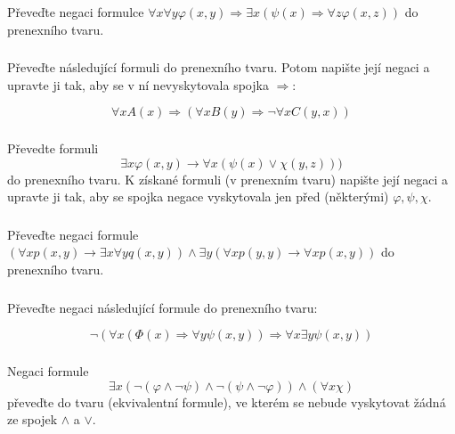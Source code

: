 \subsubsection{}
Převeďte negaci formulce $\forall x \forall y \varphi(x,y) \Rightarrow \exists x
(\psi(x) \Rightarrow \forall z \varphi(x,z))$ do prenexního tvaru.
\subsubsection{}
Převeďte následující formuli do prenexního tvaru. Potom napište její negaci a
upravte ji tak, aby se v ní nevyskytovala spojka $\Rightarrow$:

$$\forall x A(x) \Rightarrow (\forall x B(y) \Rightarrow \neg \forall x
C(y,x))$$
\subsubsection{}
Převedte formuli $$\exists x \varphi (x,y) \rightarrow \forall x(\psi(x)\vee
\chi (y,z)))$$ do prenexního tvaru. K získané formuli (v prenexním tvaru)
napište její negaci a upravte ji tak, aby se spojka negace vyskytovala jen před
(některými) $\varphi, \psi, \chi$.
\subsubsection{}
Převeďte negaci formule $(\forall x p(x,y) \rightarrow \exists x \forall y
q(x,y)) \wedge  \exists y (\forall x p(y,y) \rightarrow \forall x p(x,y))$ do
prenexního tvaru.
\subsubsection{}
Převeďte negaci následující formule do prenexního tvaru:

$$\neg(\forall x (\Phi (x) \Rightarrow \forall y \psi(x,y)) \Rightarrow \forall
x \exists y \psi(x,y))$$
\subsubsection{}
Negaci formule 
$$\exists x (\neg (\varphi \wedge \neg \psi)\wedge \neg(\psi\wedge
\neg \varphi))\wedge (\forall x \chi )$$ 
převeďte do tvaru (ekvivalentní formule), ve kterém se nebude vyskytovat žádná
ze spojek $\wedge$ a $ \vee $.
